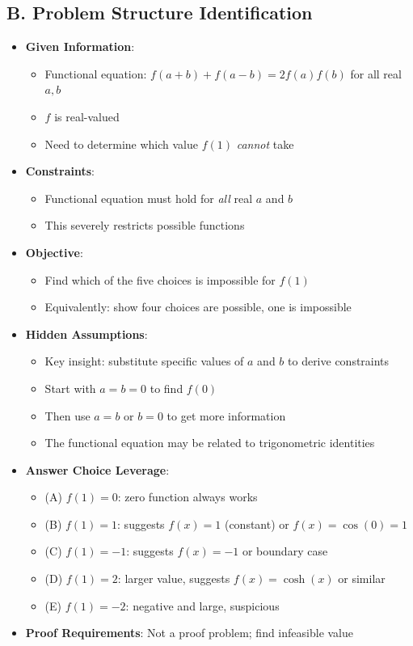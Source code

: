 \documentclass[12pt]{article}
\begin{document}
\begin{problemconfigbox}
\subsection*{B. Problem Structure Identification}
\begin{itemize}[leftmargin=*]
    \item \textbf{Given Information}: 
    \begin{itemize}
        \item Functional equation: $f(a + b) + f(a - b) = 2f(a) f(b)$ for all real $a, b$
        \item $f$ is real-valued
        \item Need to determine which value $f(1)$ \emph{cannot} take
    \end{itemize}
    \item \textbf{Constraints}: 
    \begin{itemize}
        \item Functional equation must hold for \emph{all} real $a$ and $b$
        \item This severely restricts possible functions
    \end{itemize}
    \item \textbf{Objective}: 
    \begin{itemize}
        \item Find which of the five choices is impossible for $f(1)$
        \item Equivalently: show four choices are possible, one is impossible
    \end{itemize}
    \item \textbf{Hidden Assumptions}: 
    \begin{itemize}
        \item Key insight: substitute specific values of $a$ and $b$ to derive constraints
        \item Start with $a = b = 0$ to find $f(0)$
        \item Then use $a = b$ or $b = 0$ to get more information
        \item The functional equation may be related to trigonometric identities
    \end{itemize}
    \item \textbf{Answer Choice Leverage}: 
    \begin{itemize}
        \item (A) $f(1) = 0$: zero function always works
        \item (B) $f(1) = 1$: suggests $f(x) = 1$ (constant) or $f(x) = \cos(0) = 1$
        \item (C) $f(1) = -1$: suggests $f(x) = -1$ or boundary case
        \item (D) $f(1) = 2$: larger value, suggests $f(x) = \cosh(x)$ or similar
        \item (E) $f(1) = -2$: negative and large, suspicious
    \end{itemize}
    \item \textbf{Proof Requirements}: Not a proof problem; find infeasible value
\end{itemize}


\end{problemconfigbox}
\end{document}

